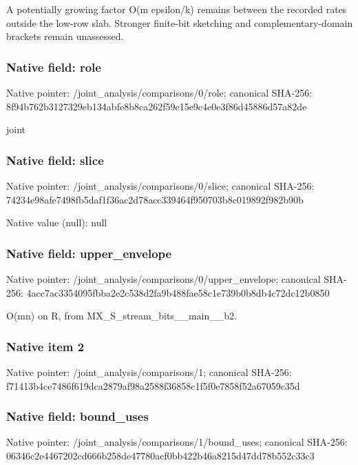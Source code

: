 \documentclass[10pt,a4paper]{article}
\begin{document}
\begingroup\raggedright\sloppy A potentially growing factor O(m epsilon/\allowbreak{}k) remains between the recorded rates outside the low-row slab. Stronger finite-bit sketching and complementary-domain brackets remain unassessed.\par\endgroup

\subsubsection{Native field: role}
Native pointer: /joint\_\allowbreak{}analysis/comparisons/0/role; canonical SHA-256: 8f94b762b3127329eb134abfe8b8ca262f59c15e9c4e0e3f86d45886d57a82de

\begingroup\raggedright\sloppy joint\par\endgroup

\subsubsection{Native field: slice}
Native pointer: /joint\_\allowbreak{}analysis/comparisons/0/slice; canonical SHA-256: 74234e98afe7498fb5daf1f36ac2d78acc339464f950703b8c019892f982b90b

Native value (null): null

\subsubsection{Native field: upper\_\allowbreak{}envelope}
Native pointer: /joint\_\allowbreak{}analysis/comparisons/0/upper\_\allowbreak{}envelope; canonical SHA-256: 4acc7ac3354095fbba2e2c538d2fa9b488fae58c1e739b0b8db4c72dc12b0850

\begingroup\raggedright\sloppy O(mn) on R,\allowbreak{} from MX\_\allowbreak{}S\_\allowbreak{}stream\_\allowbreak{}bits\_\allowbreak{}\_\allowbreak{}main\_\allowbreak{}\_\allowbreak{}b2.\par\endgroup

\subsubsection{Native item 2}
Native pointer: /joint\_\allowbreak{}analysis/comparisons/1; canonical SHA-256: f71413b4ce7486f619dca2879af98a2588f36858c1f5f0e7858f52a67059c35d

\subsubsection{Native field: bound\_\allowbreak{}uses}
Native pointer: /joint\_\allowbreak{}analysis/comparisons/1/bound\_\allowbreak{}uses; canonical SHA-256: 06346c2e4467202cd666b258de47780acf0bb422b46a8215d47dd78b552c33c3
\end{document}
